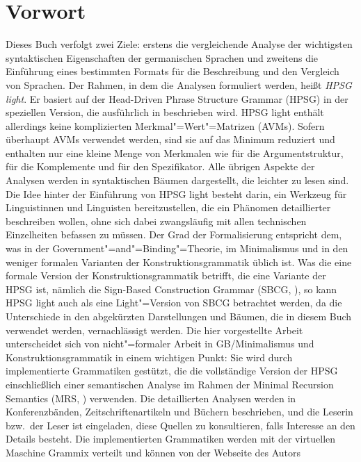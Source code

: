 \chapter{Vorwort}

Dieses Buch verfolgt zwei Ziele: erstens die vergleichende Analyse der wichtigsten syntaktischen Eigenschaften der
germanischen Sprachen und zweitens die Einführung eines bestimmten Formats für die Beschreibung und
den Vergleich von Sprachen. Der Rahmen, in dem die Analysen formuliert werden, heißt \emph{HPSG
  light}. Er basiert auf der Head-Driven Phrase Structure Grammar (HPSG) \citep*{ps,ps2,HPSGHandbook} in der speziellen Version, die ausführlich in
 beschrieben wird. HPSG light enthält allerdings keine komplizierten Merkmal"=Wert"=Matrizen
(AVMs). Sofern überhaupt AVMs verwendet werden, sind sie auf das Minimum reduziert und enthalten nur eine kleine Menge
von Merkmalen wie \argst für die Argumentstruktur, \comps für die Komplemente und \spr für den Spezifikator. Alle
übrigen Aspekte der Analysen werden in syntaktischen Bäumen dargestellt, die leichter zu lesen sind. Die Idee
hinter der Einführung von HPSG light besteht darin, ein Werkzeug für Linguistinnen und Linguisten bereitzustellen, die ein
Phänomen detaillierter beschreiben wollen, ohne sich dabei zwangsläufig mit allen
technischen Einzelheiten befassen zu müssen. Der Grad der Formalisierung entspricht dem, was in der Government"=and"=Binding"=Theorie,
im Minimalismus und in den weniger formalen Varianten der Konstruktionsgrammatik üblich ist. Was die eine formale Version
der Konstruktionsgrammatik betrifft, die eine Variante der HPSG ist, nämlich die Sign-Based Construction Grammar (SBCG, \citealp{Sag2012a}), so kann HPSG
light auch als eine Light"=Version von SBCG betrachtet werden, da die Unterschiede in den
abgekürzten Darstellungen und Bäumen, die in diesem Buch verwendet werden, vernachlässigt werden. Die hier vorgestellte Arbeit unterscheidet sich
von nicht"=formaler Arbeit in GB/Minimalismus und Konstruktionsgrammatik in einem wichtigen Punkt: Sie wird
durch implementierte Grammatiken gestützt, die die vollständige Version der HPSG einschließlich einer semantischen Analyse im
Rahmen der Minimal Recursion Semantics (MRS, ) verwenden. Die detaillierten Analysen werden in
Konferenzbänden, Zeitschriftenartikeln und Büchern beschrieben, und die Leserin bzw.\ der Leser ist eingeladen, diese
Quellen zu konsultieren, falls Interesse an den Details besteht. Die implementierten Grammatiken werden
mit der virtuellen Maschine Grammix \citep{MuellerGrammix} verteilt und können von der Webseite des Autors
